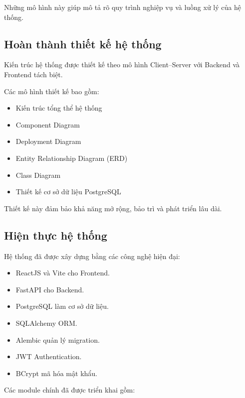 Những mô hình này giúp mô tả rõ quy trình nghiệp vụ và luồng xử lý của hệ thống.


\subsection{Hoàn thành thiết kế hệ thống}

Kiến trúc hệ thống được thiết kế theo mô hình Client--Server với Backend và Frontend tách biệt.

Các mô hình thiết kế bao gồm:

\begin{itemize}
\item Kiến trúc tổng thể hệ thống
\item Component Diagram
\item Deployment Diagram
\item Entity Relationship Diagram (ERD)
\item Class Diagram
\item Thiết kế cơ sở dữ liệu PostgreSQL
\end{itemize}

Thiết kế này đảm bảo khả năng mở rộng, bảo trì và phát triển lâu dài.


\subsection{Hiện thực hệ thống}

Hệ thống đã được xây dựng bằng các công nghệ hiện đại:

\begin{itemize}
\item ReactJS và Vite cho Frontend.
\item FastAPI cho Backend.
\item PostgreSQL làm cơ sở dữ liệu.
\item SQLAlchemy ORM.
\item Alembic quản lý migration.
\item JWT Authentication.
\item BCrypt mã hóa mật khẩu.
\end{itemize}

Các module chính đã được triển khai gồm:

